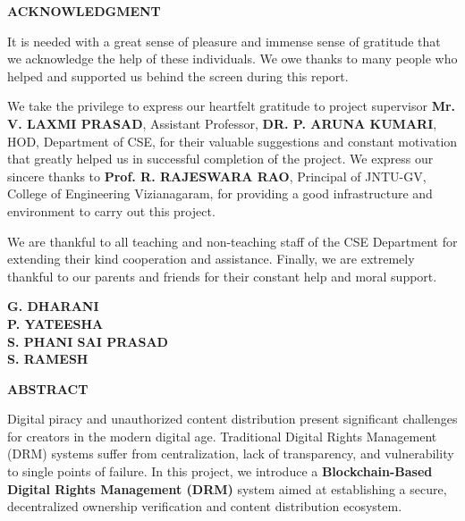 \documentclass[12pt,a4paper]{report}
\begin{document}
\newpage
\begin{center}
    \Large{\textbf{ACKNOWLEDGMENT}}
\end{center}

\vspace{1cm}
\noindent
It is needed with a great sense of pleasure and immense sense of gratitude that we acknowledge the help of these individuals. We owe thanks to many people who helped and supported us behind the screen during this report.

\vspace{0.5cm}
\noindent
We take the privilege to express our heartfelt gratitude to project supervisor \textbf{Mr. V. LAXMI PRASAD}, Assistant Professor, \textbf{DR. P. ARUNA KUMARI}, HOD, Department of CSE, for their valuable suggestions and constant motivation that greatly helped us in successful completion of the project. We express our sincere thanks to \textbf{Prof. R. RAJESWARA RAO}, Principal of JNTU-GV, College of Engineering Vizianagaram, for providing a good infrastructure and environment to carry out this project.

\vspace{0.5cm}
\noindent
We are thankful to all teaching and non-teaching staff of the CSE Department for extending their kind cooperation and assistance. Finally, we are extremely thankful to our parents and friends for their constant help and moral support.

\vspace{2cm}
\noindent
\textbf{G. DHARANI}\\
\textbf{P. YATEESHA}\\
\textbf{S. PHANI SAI PRASAD}\\
\textbf{S. RAMESH}

\newpage
\begin{center}
    \Large{\textbf{ABSTRACT}}
\end{center}

\vspace{1cm}
\noindent
Digital piracy and unauthorized content distribution present significant challenges for creators in the modern digital age. Traditional Digital Rights Management (DRM) systems suffer from centralization, lack of transparency, and vulnerability to single points of failure. In this project, we introduce a \textbf{Blockchain-Based Digital Rights Management (DRM)} system aimed at establishing a secure, decentralized ownership verification and content distribution ecosystem. 
\end{document}
